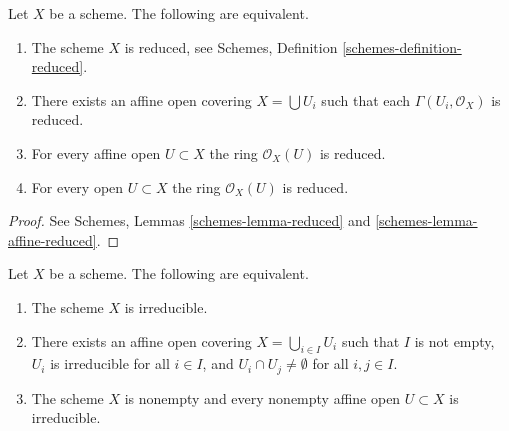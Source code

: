 \begin{lemma}
\label{lemma-characterize-reduced}
Let $X$ be a scheme.
The following are equivalent.
\begin{enumerate}
\item The scheme $X$ is reduced, see
Schemes, Definition \ref{schemes-definition-reduced}.
\item There exists an affine open covering $X = \bigcup U_i$
such that each $\Gamma(U_i, \mathcal{O}_X)$ is reduced.
\item For every affine open $U \subset X$ the ring
$\mathcal{O}_X(U)$ is reduced.
\item For every open $U \subset X$ the ring $\mathcal{O}_X(U)$ is reduced.
\end{enumerate}
\end{lemma}

\begin{proof}
See Schemes, Lemmas \ref{schemes-lemma-reduced} and
\ref{schemes-lemma-affine-reduced}.
\end{proof}

\begin{lemma}
\label{lemma-characterize-irreducible}
Let $X$ be a scheme.
The following are equivalent.
\begin{enumerate}
\item The scheme $X$ is irreducible.
\item There exists an affine open covering $X = \bigcup_{i \in I} U_i$
such that $I$ is not empty, $U_i$ is irreducible for all $i \in I$, and
$U_i \cap U_j \not = \emptyset$ for all $i, j \in I$.
\item The scheme $X$ is nonempty and every nonempty affine open
$U \subset X$ is irreducible.
\end{enumerate}
\end{lemma}

